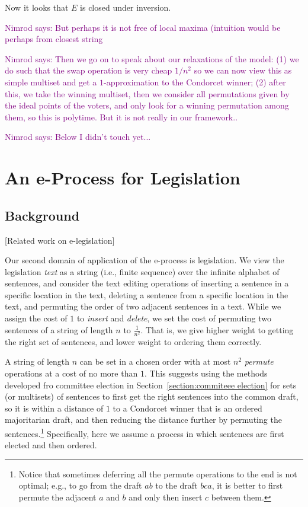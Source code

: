 \documentclass[sigconf]{aamas}  %
\newcommand{\nimrod}[1]{\textcolor{purple}{Nimrod says: #1}}
\begin{document}
Now it looks that $E$ is closed under inversion.

\nimrod{%
But perhaps it is not free of local maxima (intuition would be perhaps from closest string}

\nimrod{Then we go on to speak about our relaxations of the model:
  (1) we do such that the swap operation is very cheap $1/n^2$ so we can now view this as simple multiset and get a $1$-approximation to the Condorcet winner;
  (2) after this, we take the winning multiset, then we consider all permutations given by the ideal points of the voters, and only look for a winning permutation among them, so this is polytime. But it is not really in our framework..}

\nimrod{Below I didn't touch yet...}


\section{An e-Process for Legislation}
\label{section:e-process legislation}

\subsection{Background}

[Related work on e-legislation]

Our second domain of application of the e-process is legislation.
We view the legislation \emph{text} as a string (i.e., finite sequence) over the infinite alphabet of sentences, and consider the text editing operations of inserting a sentence in a specific location in the text, deleting a sentence from a specific location in the text, and permuting the order of two adjacent sentences in a text. While we assign the cost of $1$ to \emph{insert} and \emph{delete}, we set the cost of permuting two sentences of a string of length $n$ to $\frac{1}{n^2}$.  That is, we give higher weight to getting the right set of sentences, and lower weight to ordering them correctly. 

A string of length $n$ can be set in a chosen order with at most ${n^2}$ \emph{permute} operations at a cost of no more than $1$. This suggests using the methods developed fro committee election in Section~\ref{section:commiteee election} for sets (or multisets) of sentences to first get the right sentences into the common draft, so it is within a distance of $1$ to a Condorcet winner that is an ordered majoritarian draft, and then reducing the distance further by permuting the sentences.\footnote{
Notice that sometimes deferring all the permute operations to the end is not optimal; e.g., to go from the draft $ab$ to the draft $bca$, it is better to first permute the adjacent $a$ and $b$ and only then insert $c$ between them.} Specifically, here we assume a process in which sentences are first elected and then ordered.
\end{document}
